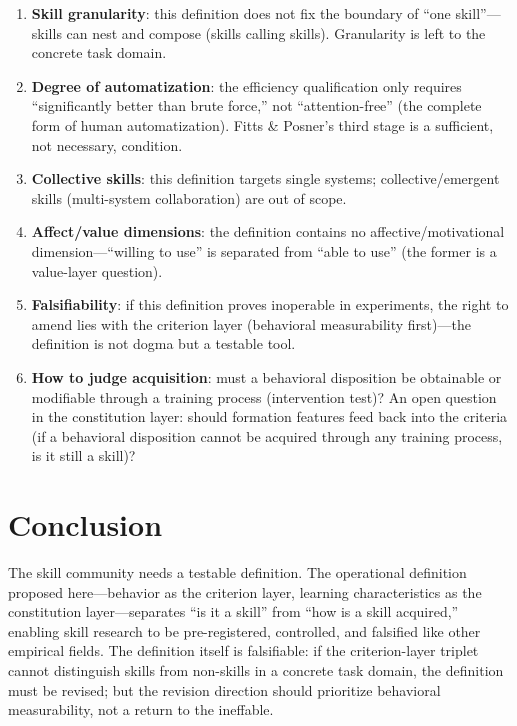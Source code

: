 \documentclass[11pt]{article}
\begin{document}
\begin{enumerate}
\item \textbf{Skill granularity}: this definition does not fix the boundary of ``one skill''---skills can nest and compose (skills calling skills). Granularity is left to the concrete task domain.
\item \textbf{Degree of automatization}: the efficiency qualification only requires ``significantly better than brute force,'' not ``attention-free'' (the complete form of human automatization). Fitts \& Posner's third stage is a sufficient, not necessary, condition.
\item \textbf{Collective skills}: this definition targets single systems; collective/emergent skills (multi-system collaboration) are out of scope.
\item \textbf{Affect/value dimensions}: the definition contains no affective/motivational dimension---``willing to use'' is separated from ``able to use'' (the former is a value-layer question).
\item \textbf{Falsifiability}: if this definition proves inoperable in experiments, the right to amend lies with the criterion layer (behavioral measurability first)---the definition is not dogma but a testable tool.
\item \textbf{How to judge acquisition}: must a behavioral disposition be obtainable or modifiable through a training process (intervention test)? An open question in the constitution layer: should formation features feed back into the criteria (if a behavioral disposition cannot be acquired through any training process, is it still a skill)?
\end{enumerate}

\section{Conclusion}
\label{sec:conclusion}

The skill community needs a testable definition. The operational definition proposed here---behavior as the criterion layer, learning characteristics as the constitution layer---separates ``is it a skill'' from ``how is a skill acquired,'' enabling skill research to be pre-registered, controlled, and falsified like other empirical fields. The definition itself is falsifiable: if the criterion-layer triplet cannot distinguish skills from non-skills in a concrete task domain, the definition must be revised; but the revision direction should prioritize behavioral measurability, not a return to the ineffable.
\end{document}
